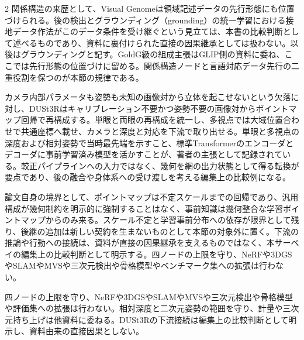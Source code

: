 \documentclass[lualatex,a4paper,10pt]{jlreq}
\begin{document}
\begin{multicols}{2}
\noindent 関係構造の来歴として、Visual Genomeは領域記述データの先行形態にも位置づけられる。後の検出とグラウンディング（grounding）の統一学習における接地データ作法がこのデータ条件を受け継ぐという見立ては、本書の比較判断として述べるものであり、資料に裏付けられた直接の因果継承としては扱わない。以後はグラウンディングと記す。GoldG級の組成主張はGLIP側の資料に委ね、ここでは先行形態の位置づけに留める。関係構造ノードと言語対応データ先行の二重役割を保つのが本節の規律である。\autocite{vmd021}\par\medskip
\noindent カメラ内部パラメータも姿勢も未知の画像対から立体を起こせないという欠落に対し、DUSt3Rはキャリブレーション不要かつ姿勢不要の画像対からポイントマップ回帰で再構成する。単眼と両眼の再構成を統一し、多視点では大域位置合わせで共通座標へ載せ、カメラと深度と対応を下流で取り出せる。単眼と多視点の深度および相対姿勢で当時最先端を示すこと、標準Transformerのエンコーダとデコーダに事前学習済み模型を活かすことが、著者の主張として記録されている。較正パイプラインへの入力ではなく、幾何を網の出力状態として得る転換が要点であり、後の融合や身体系への受け渡しを考える編集上の比較例になる。\autocite{vmd022}\par\medskip
\noindent 論文自身の境界として、ポイントマップは不定スケールまでの回帰であり、汎用構成が幾何制約を明示的に強制することはなく、事前知識は幾何整合な学習ポイントマップからのみ来る。スケール不定と学習事前分布への依存が限界として残り、後継の追加は新しい契約を生まないものとして本節の対象外に置く。下流の推論や行動への接続は、資料が直接の因果継承を支えるものではなく、本サーベイの編集上の比較判断として明示する。四ノードの上限を守り、NeRFや3DGSやSLAMやMVSや三次元検出や骨格模型やベンチマーク集への拡張は行わない。\autocite{vmd022}\par\medskip
\end{multicols}
\begin{claimboundary}[本節の読解上の境界]
\noindent 四ノードの上限を守り、NeRFや3DGSやSLAMやMVSや三次元検出や骨格模型や評価集への拡張は行わない。相対深度と二次元姿勢の範囲を守り、計量や三次元持ち上げは他資料に委ねる。DUSt3Rの下流接続は編集上の比較判断として明示し、資料由来の直接因果としない。\autocite{vmd019,vmd020,vmd021,vmd022}\par
\end{claimboundary}

\Needspace{0.20\textheight}
\end{document}
